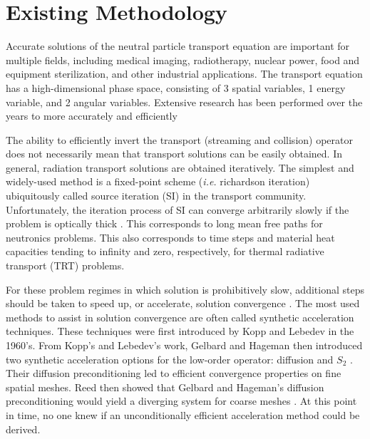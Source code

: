 \documentclass[11pt]{article}
\begin{document}
\section{Existing Methodology}
\label{sec::PS}
Accurate solutions of the neutral particle transport equation are important for multiple fields, including medical imaging, radiotherapy, nuclear power, food and equipment sterilization, and other industrial applications. The transport equation has a high-dimensional phase space, consisting of 3 spatial variables, 1 energy variable, and 2 angular variables. Extensive research has been performed over the years to more accurately and efficiently 

The ability to efficiently invert the transport (streaming and collision) operator does not necessarily mean that transport solutions can be easily obtained. In general, radiation transport solutions are obtained iteratively. The simplest and widely-used method is a fixed-point scheme ({\em i.e.} richardson iteration) ubiquitously called source iteration (SI) in the transport community. Unfortunately, the iteration process of SI can converge arbitrarily slowly if the problem is optically thick \cite{ref::adams_larsen_iter_methods}. This corresponds to long mean free paths for neutronics problems. This also corresponds to time steps and material heat capacities tending to infinity and zero, respectively, for thermal radiative transport (TRT) problems.

For these problem regimes in which solution is prohibitively slow, additional steps should be taken to speed up, or accelerate, solution convergence \cite{ref::adams_larsen_iter_methods}. The most used methods to assist in solution convergence are often called synthetic acceleration techniques. These techniques were first introduced by Kopp  \cite{kopp1963synthetic} and Lebedev \cite{lebedevI} in the 1960's. From Kopp's and Lebedev's work, Gelbard and Hageman then introduced two synthetic acceleration options for the low-order operator: diffusion and $S_2$ \cite{gelbard1969synthetic}. Their diffusion preconditioning led to efficient convergence properties on fine spatial meshes. Reed then showed that Gelbard and Hageman's diffusion preconditioning would yield a diverging system for coarse meshes \cite{reed1971effectiveness}. At this point in time, no one knew if an unconditionally efficient acceleration method could be derived.
\end{document}

